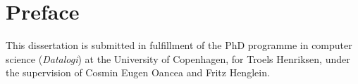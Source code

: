 {}
\chapter*{Preface}

This dissertation is submitted in fulfillment of the PhD programme in
computer science (\textit{Datalogi}) at the University of Copenhagen,
for Troels Henriksen, under the supervision of Cosmin Eugen Oancea and
Fritz Henglein.

